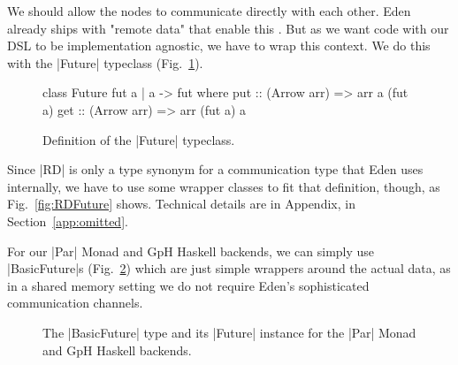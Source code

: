 We should allow the nodes to communicate directly with each other. Eden already ships with "remote data" that enable this \cite{AlGo03a,Dieterle2010}.
But as we want code with our DSL to be implementation agnostic, we have to wrap this context. We do this with the |Future| typeclass (Fig.~\ref{fig:future}).
\begin{figure}[h]
\begin{code}
class Future fut a | a -> fut where
    put :: (Arrow arr) => arr a (fut a)
    get :: (Arrow arr) => arr (fut a) a
\end{code}
\caption{Definition of the |Future| typeclass.}
\label{fig:future}
\end{figure}
Since |RD| is only a type synonym for a communication type that Eden uses internally, we have to use some wrapper classes to fit that definition, though, as Fig.~\ref{fig:RDFuture} shows. %
Technical details are in Appendix, in Section~\ref{app:omitted}.

For our |Par| Monad and GpH Haskell backends, we can simply use |BasicFuture|s (Fig.~\ref{fig:BasicFuture}) which are just simple wrappers around the actual data, as in a shared memory setting we do not require Eden's sophisticated communication channels.
\begin{figure}[tb]
\caption{The |BasicFuture| type and its |Future| instance for the |Par| Monad and GpH Haskell backends.}
\label{fig:BasicFuture}
\end{figure} %


